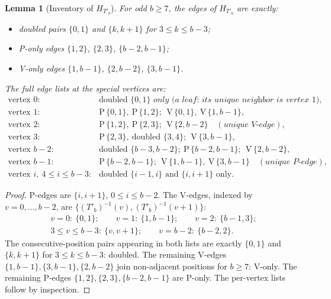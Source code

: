 \documentclass[11pt]{article}
\newtheorem{lemma}[theorem]{Lemma}
\theoremstyle{definition}
\newcommand{\inv}[1]{#1^{-1}}
\begin{document}
\begin{lemma}[Inventory of $H_{T'_b}$]\label{lem:oddb-inventory}
For odd $b \ge 7$, the edges of $H_{T'_b}$ are exactly:
\begin{itemize}
\item \emph{doubled pairs} $\{0,1\}$ and $\{k, k+1\}$ for $3 \le k \le b-3$;
\item \emph{P-only edges} $\{1,2\}$, $\{2,3\}$, $\{b-2, b-1\}$;
\item \emph{V-only edges} $\{1, b-1\}$, $\{2, b-2\}$, $\{3, b-1\}$.
\end{itemize}
The full edge lists at the special vertices are:
\[
\begin{array}{ll}
\text{vertex } 0: & \text{doubled } \{0,1\} \textit{ only (a leaf: its unique
neighbor is vertex } 1\textit{)},\\[2pt]
\text{vertex } 1: & \mathrm P\,\{0,1\},\ \mathrm P\,\{1,2\};\ \ \mathrm V\,\{0,1\},\
\mathrm V\,\{1,b{-}1\},\\[2pt]
\text{vertex } 2: & \mathrm P\,\{1,2\},\ \mathrm P\,\{2,3\};\ \ \mathrm V\,\{2,b{-}2\}
\quad (\textit{unique V-edge}),\\[2pt]
\text{vertex } 3: & \mathrm P\,\{2,3\},\ \text{doubled } \{3,4\};\ \
\mathrm V\,\{3,b{-}1\},\\[2pt]
\text{vertex } b{-}2: & \text{doubled } \{b{-}3,b{-}2\};\ \mathrm P\,\{b{-}2,b{-}1\};\
\ \mathrm V\,\{2,b{-}2\},\\[2pt]
\text{vertex } b{-}1: & \mathrm P\,\{b{-}2,b{-}1\};\ \ \mathrm V\,\{1,b{-}1\},\
\mathrm V\,\{3,b{-}1\} \quad (\textit{unique P-edge}),\\[2pt]
\text{vertex } i,\ 4 \le i \le b-3: & \text{doubled } \{i{-}1,i\} \text{ and }
\{i,i{+}1\} \text{ only}.
\end{array}
\]
\end{lemma}

\begin{proof}
P-edges are $\{i, i+1\}$, $0 \le i \le b-2$. The V-edges, indexed by
$v = 0, \dots, b-2$, are $\{\inv{(T'_b)}(v), \inv{(T'_b)}(v+1)\}$:
\begin{gather*}
v = 0:\ \{0,1\}; \qquad
v = 1:\ \{1, b{-}1\}; \qquad
v = 2:\ \{b{-}1, 3\}; \\
3 \le v \le b-3:\ \{v, v{+}1\}; \qquad
v = b-2:\ \{b{-}2, 2\}.
\end{gather*}
The consecutive-position pairs appearing in both lists are exactly $\{0,1\}$ and
$\{k,k+1\}$ for $3 \le k \le b-3$: doubled. The remaining V-edges
$\{1,b-1\}, \{3,b-1\}, \{2,b-2\}$ join non-adjacent positions for $b \ge 7$: V-only.
The remaining P-edges $\{1,2\}, \{2,3\}, \{b-2,b-1\}$ are P-only. The per-vertex lists
follow by inspection.
\end{proof}
\end{document}
